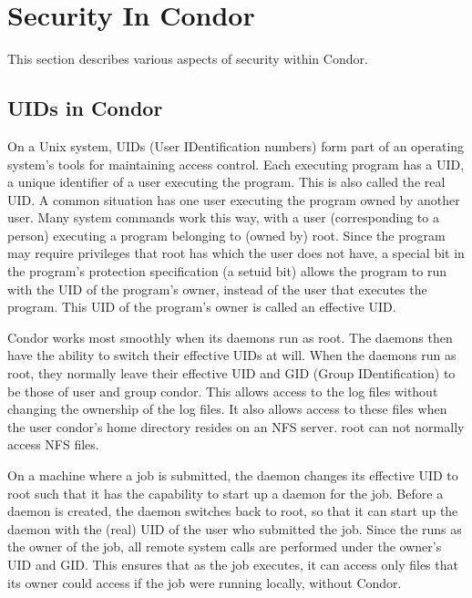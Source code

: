 \section{\label{sec:Security}Security In Condor}

This section describes various aspects of security within Condor.

\subsection{\label{sec:uids}UIDs in Condor}


On a Unix system,
UIDs (User IDentification numbers) form part of an operating system's
tools for maintaining access control.
Each executing program has a UID,
a unique identifier of a user executing the program.
This is also called the real UID.
A common situation has one user executing the program owned
by another user.
Many system commands work this way, with a user (corresponding
to a person) executing a program belonging to (owned by) root.
Since the program may require privileges that root has which
the user does not have, a special bit in the program's
protection specification (a setuid bit) allows the program
to run with the UID of the program's owner, instead of the
user that executes the program.
This UID of the program's owner is called an effective UID.

Condor works most smoothly when its daemons run as root.
The daemons then have the ability to switch their 
effective UIDs at will.
When the daemons run as root,
they normally leave their effective UID and GID (Group IDentification)
to be those of user and group condor.
This allows access to the log files without
changing the ownership of the log files.
It also allows access to these files when
the user condor's home directory resides on an NFS server.
root can not normally access NFS files.

On a machine where a job is submitted,
the  daemon
changes its effective UID to root
such that it has the capability to start up a  daemon
for the job.
Before a  daemon is created,
the  daemon
switches back to root,
so that it can start up the  daemon with the (real) UID
of the user who submitted the job.
Since the  runs as the owner of the job,
all remote system calls are performed under the owner's UID
and GID.
This ensures that as the job executes,
it can access only files that its owner could access if the job
were running locally, without Condor.

